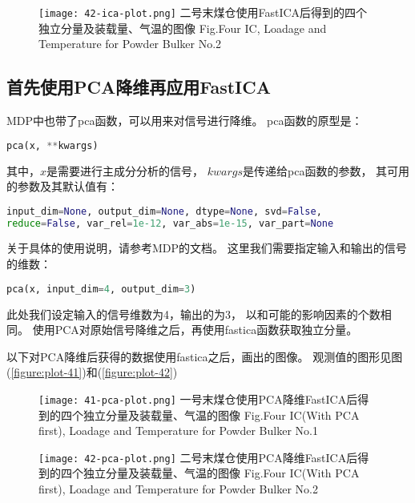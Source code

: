 \begin{figure}[!htbp]
   \centering
   \texttt{[image: 42-ica-plot.png]}
				    {二号末煤仓使用FastICA后得到的四个独立分量及装载量、气温的图像}
			{Fig.}{Four IC, Loadage and Temperature for Powder Bulker No.2}
\end{figure}


\subsection{首先使用PCA降维再应用FastICA}
MDP中也带了pca函数，可以用来对信号进行降维。
pca函数的原型是：
\begin{lstlisting}[language=Python, basicstyle=\ttfamily]
pca(x, **kwargs)
\end{lstlisting}
其中，$x$是需要进行主成分分析的信号，
$kwargs$是传递给pca函数的参数，
其可用的参数及其默认值有：
\begin{lstlisting}[language=Python, basicstyle=\ttfamily]
input_dim=None, output_dim=None, dtype=None, svd=False, 
reduce=False, var_rel=1e-12, var_abs=1e-15, var_part=None
\end{lstlisting}
关于具体的使用说明，请参考MDP的文档。
这里我们需要指定输入和输出的信号的维数：
\begin{lstlisting}[language=Python, basicstyle=\ttfamily]
pca(x, input_dim=4, output_dim=3)
\end{lstlisting}
此处我们设定输入的信号维数为4，输出的为3，
以和可能的影响因素的个数相同。
使用PCA对原始信号降维之后，再使用fastica函数获取独立分量。

以下对PCA降维后获得的数据使用fastica之后，画出的图像。
观测值的图形见图(\ref{figure:plot-41})和(\ref{figure:plot-42})

\begin{figure}[!htbp]
   \centering
   \texttt{[image: 41-pca-plot.png]}
				    {一号末煤仓使用PCA降维FastICA后得到的四个独立分量及装载量、气温的图像}
			{Fig.}{Four IC(With PCA first), Loadage and Temperature for Powder Bulker No.1}
\end{figure}

\begin{figure}[!htbp]
   \centering
   \texttt{[image: 42-pca-plot.png]}
				    {二号末煤仓使用PCA降维FastICA后得到的四个独立分量及装载量、气温的图像}
			{Fig.}{Four IC(With PCA first), Loadage and Temperature for Powder Bulker No.2}
\end{figure}

